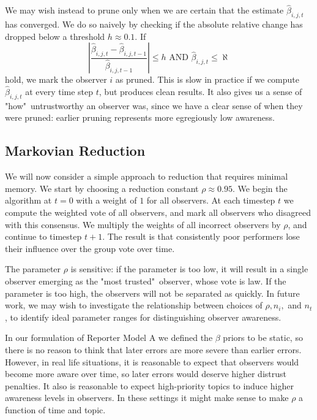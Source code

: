 \documentclass{amsart}
\theoremstyle{plain}
\numberwithin{equation}{section}
\begin{document}
We may wish instead to prune only when we are certain that the estimate $%
\hat{\beta}_{i,j,t}$ has converged. We do so naively by checking if the
absolute relative change has dropped below a threshold $h\approx 0.1$. If 
\begin{equation*}
\left\vert \frac{\hat{\beta}_{i,j,t}-\hat{\beta}_{i,j,t-1}}{\hat{\beta}%
_{i,j,t-1}}\right\vert \leq h\text{ AND }\hat{\beta}_{i,j,t}\leq \aleph 
\end{equation*}%
hold, we mark the observer $i$ as pruned. This is slow in practice if we
compute $\hat{\beta}_{i,j,t}$ at every time step $t$, but produces clean
results. It also gives us a sense of "how"\ untrustworthy an observer was,
since we have a clear sense of when they were pruned: earlier pruning
represents more egregiously low awareness.

\subsection{Markovian Reduction}

We will now consider a simple approach to reduction that requires minimal
memory. We start by choosing a reduction constant $\rho \approx 0.95$. We
begin the algorithm at $t=0$ with a weight of $1$ for all observers. At each
timestep $t$ we compute the weighted vote of all observers, and mark all
observers who disagreed with this consensus. We multiply the weights of all
incorrect observers by $\rho $, and continue to timestep $t+1$. The result
is that consistently poor performers lose their influence over the group
vote over time.

The parameter $\rho $ is sensitive: if the parameter is too low, it will
result in a single observer emerging as the "most trusted"\ observer, whose
vote is law. If the parameter is too high, the observers will not be
separated as quickly. In future work, we may wish to investigate the
relationship between choices of $\rho ,n_{i},$ and $n_{t}$, to identify
ideal parameter ranges for distinguishing observer awareness.

In our formulation of Reporter Model A we defined the $\beta $ priors to be
static, so there is no reason to think that later errors are more severe
than earlier errors. However, in real life situations, it is reasonable to
expect that observers would become more aware over time, so later errors
would deserve higher distrust penalties. It also is reasonable to expect
high-priority topics to induce higher awareness levels in observers. In
these settings it might make sense to make $\rho $ a function of time and
topic.
\end{document}
